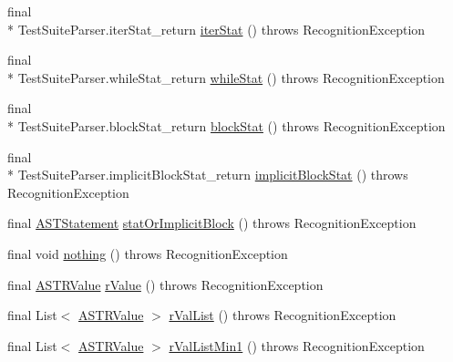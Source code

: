 \begin{DoxyCompactItemize}
\item 
final \\*
Test\-Suite\-Parser.\-iter\-Stat\-\_\-return \hyperlink{classorg_1_1tzi_1_1use_1_1parser_1_1testsuite_1_1_test_suite_parser_a615c41cdbb1d35ff30b4a22401883624}{iter\-Stat} ()  throws Recognition\-Exception 
\item 
final \\*
Test\-Suite\-Parser.\-while\-Stat\-\_\-return \hyperlink{classorg_1_1tzi_1_1use_1_1parser_1_1testsuite_1_1_test_suite_parser_a93c0e88aca028108cd3d295fa752b052}{while\-Stat} ()  throws Recognition\-Exception 
\item 
final \\*
Test\-Suite\-Parser.\-block\-Stat\-\_\-return \hyperlink{classorg_1_1tzi_1_1use_1_1parser_1_1testsuite_1_1_test_suite_parser_a5f97102f0ae4d8ba8b599261d510a6d0}{block\-Stat} ()  throws Recognition\-Exception 
\item 
final \\*
Test\-Suite\-Parser.\-implicit\-Block\-Stat\-\_\-return \hyperlink{classorg_1_1tzi_1_1use_1_1parser_1_1testsuite_1_1_test_suite_parser_af9fc739d9fa9dc7e1f5e0b6db432b82b}{implicit\-Block\-Stat} ()  throws Recognition\-Exception 
\item 
final \hyperlink{classorg_1_1tzi_1_1use_1_1parser_1_1soil_1_1ast_1_1_a_s_t_statement}{A\-S\-T\-Statement} \hyperlink{classorg_1_1tzi_1_1use_1_1parser_1_1testsuite_1_1_test_suite_parser_a858308fd5e7f5621a669164e5dedc9fe}{stat\-Or\-Implicit\-Block} ()  throws Recognition\-Exception 
\item 
final void \hyperlink{classorg_1_1tzi_1_1use_1_1parser_1_1testsuite_1_1_test_suite_parser_a158bd80f140ad085571f510738b1cfa2}{nothing} ()  throws Recognition\-Exception 
\item 
final \hyperlink{classorg_1_1tzi_1_1use_1_1parser_1_1soil_1_1ast_1_1_a_s_t_r_value}{A\-S\-T\-R\-Value} \hyperlink{classorg_1_1tzi_1_1use_1_1parser_1_1testsuite_1_1_test_suite_parser_a3f6bc2925bc645895baa26941a4ff551}{r\-Value} ()  throws Recognition\-Exception 
\item 
final List$<$ \hyperlink{classorg_1_1tzi_1_1use_1_1parser_1_1soil_1_1ast_1_1_a_s_t_r_value}{A\-S\-T\-R\-Value} $>$ \hyperlink{classorg_1_1tzi_1_1use_1_1parser_1_1testsuite_1_1_test_suite_parser_a209243a77bcbcac73f550f833d4052bd}{r\-Val\-List} ()  throws Recognition\-Exception 
\item 
final List$<$ \hyperlink{classorg_1_1tzi_1_1use_1_1parser_1_1soil_1_1ast_1_1_a_s_t_r_value}{A\-S\-T\-R\-Value} $>$ \hyperlink{classorg_1_1tzi_1_1use_1_1parser_1_1testsuite_1_1_test_suite_parser_a732813f76d257b8d8e61b986ea76e489}{r\-Val\-List\-Min1} ()  throws Recognition\-Exception 

\end{DoxyCompactItemize}
